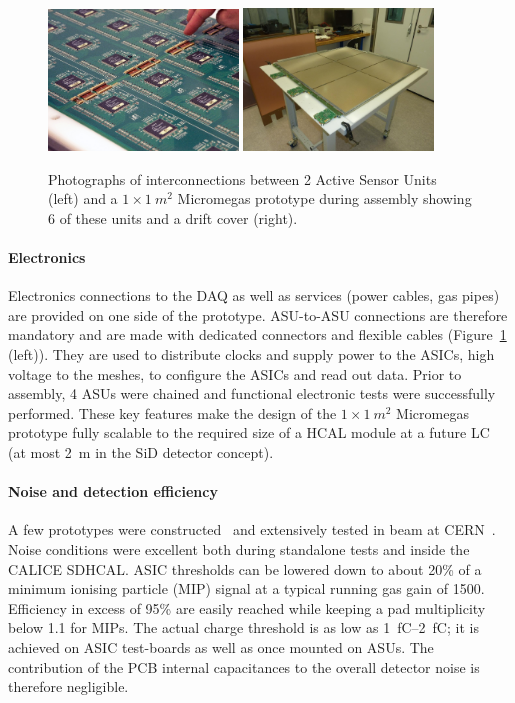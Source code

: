 \begin{figure}
\begin{centering}
\includegraphics[width=0.45\textwidth]{Calorimeter/SDHCal/interconnects}
\includegraphics[width=0.45\textwidth]{Calorimeter/SDHCal/m2_assembly}
\caption{Photographs of interconnections between 2 Active Sensor Units (left) and a $1\times \SI{1}{m^{2}}$ Micromegas prototype during assembly showing 6 of these units and a drift cover (right).}
\label{mecha_elec}
\end{centering}
\end{figure}


\paragraph{Electronics}
Electronics connections to the DAQ as well as services (power cables, gas pipes) are provided on one side of the prototype. ASU-to-ASU connections are therefore mandatory and are made with dedicated connectors and flexible cables (Figure~\ref{mecha_elec} (left)). They are used to distribute clocks and supply power to the ASICs, high voltage to the meshes, to configure the ASICs and read out data. Prior to assembly, 4 ASUs were chained and functional electronic tests were successfully performed. These key features make the design of the $1\times \SI{1}{m^{2}}$ Micromegas prototype fully scalable to the required size of a HCAL module at a future LC (at most \SI{2}{m} in the SiD detector concept).

\paragraph{Noise and detection efficiency}
A few prototypes were constructed~\cite{Adloff201390} and extensively tested in beam at CERN~\cite{Adloff:2014qea}. Noise conditions were excellent both during standalone tests and inside the CALICE SDHCAL. ASIC thresholds can be lowered down to about 20\% of a minimum ionising particle (MIP) signal at a typical running gas gain of 1500. Efficiency in excess of 95\% are easily reached while keeping a pad multiplicity below 1.1 for MIPs. The actual charge threshold is as low as \SIrange{1}{2}{fC}; it is achieved on ASIC test-boards as well as once mounted on ASUs. The contribution of the PCB internal capacitances to the overall detector noise is therefore negligible.

